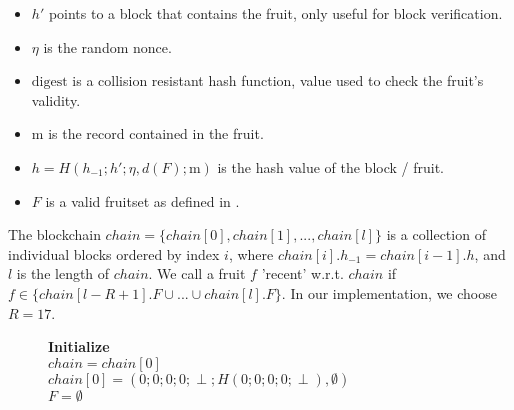 \documentclass[9pt,oneside]{amsart}
\begin{document}
\begin{multicols}{2}
\begin{itemize}
	\item $h'$ points to a block that contains the fruit, only useful for block verification. 
	
	\item $\eta$ is the random nonce. 
	
	\item $\mathrm{digest}$ is a collision resistant hash function, value used to check the fruit's validity. 
	
	\item $\mathrm{m}$ is the record contained in the fruit.
	
	\item $h = H(h_{-1}; h' ; \eta , d(F); \mathrm{m})$ is the hash value of the block / fruit.	
	
	\item $F$ is a valid fruitset as defined in \cite{pass2017fruit}.
\end{itemize}


The blockchain $chain = \{ chain[0] , chain[1] , ... , chain[l] \}$ is a collection of individual blocks ordered by index $i$, where $chain[i].h_{-1} = chain[i-1].h$, and $l$ is the length of $chain$. We call a fruit $f$ 'recent' w.r.t. $chain$ if $f \in \{ chain[l-R+1].F \cup ... \cup chain[l].F \}$. In our implementation, we choose $R = 17$. 
 
\begin{figure*}
	\begin{algorithm}[H]
		\textbf{Initialize} \\
		$chain = chain[0]$ \\
		$chain[0] = (0;0;0;0;\perp ;H(0;0;0;0;\perp ),\emptyset )$\\
		$F = \emptyset$ \\
		
		
		

\end{algorithm}
\end{figure*}
\end{multicols}
\end{document}
